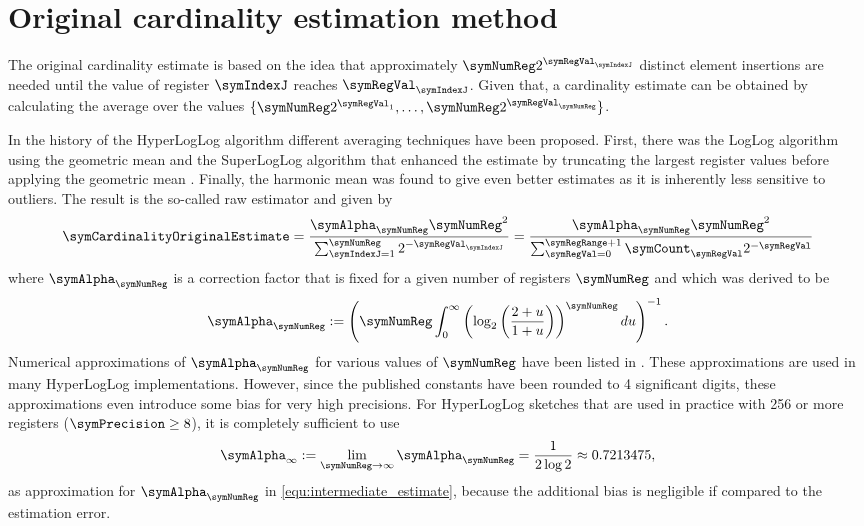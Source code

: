 \documentclass[a4paper]{scrartcl}
\begin{document}
\section{Original cardinality estimation method}
\label{sec:cardinality_estimation}
The original cardinality estimate \cite{Flajolet2007} is based on the idea that approximately $\symNumReg  2^{\symRegVal_\symIndexJ}$ distinct element insertions are needed until the value of register $\symIndexJ$ reaches $\symRegVal_\symIndexJ$. Given that, a cardinality estimate can be obtained by calculating the average over the values $\lbrace \symNumReg 2^{\symRegVal_1},\ldots,\symNumReg2^{\symRegVal_\symNumReg}\rbrace$. 

In the history of the HyperLogLog algorithm different averaging techniques have been proposed. First, there was the LogLog algorithm using the geometric mean and the SuperLogLog algorithm that enhanced the estimate by truncating the largest register values before applying the geometric mean \cite{Durand2003}. Finally, the harmonic mean was found to give even better estimates as it is inherently less sensitive to outliers. The result is the so-called raw estimator and given by
\begin{equation}
\label{equ:intermediate_estimate}
\symCardinalityOriginalEstimate
= 
\frac{\symAlpha_\symNumReg \symNumReg^2}{\sum_{\symIndexJ=1}^{\symNumReg}2^{-\symRegVal_\symIndexJ}}
= 
\frac{\symAlpha_\symNumReg \symNumReg^2}{\sum_{\symRegVal=0}^{\symRegRange+1}\symCount_\symRegVal 2^{-\symRegVal}}
\end{equation}
where $\symAlpha_\symNumReg$  is a correction factor that is fixed for a given number of registers $\symNumReg$ and which was derived to be \cite{Flajolet2007}
\begin{equation}
\symAlpha_\symNumReg := \left(
\symNumReg
\int_0^\infty
\left(
\log_2\left(
\frac{2+u}{1+u}
\right)
\right)^\symNumReg
du
\right)^{-1}.
\end{equation}
Numerical approximations of $\symAlpha_\symNumReg$ for various values of $\symNumReg$ have been listed in \cite{Flajolet2007}. These approximations are used in many HyperLogLog implementations. However, since the published constants have been rounded to 4 significant digits, these approximations even introduce some bias for very high precisions. For HyperLogLog sketches that are used in practice with 256 or more registers ($\symPrecision\geq 8$), it is completely sufficient to use 
\begin{equation}
\label{equ:alpha_inf}
\symAlpha_\infty := \lim_{\symNumReg\rightarrow\infty} \symAlpha_\symNumReg = \frac{1}{2\log 2} \approx 0.7213475,
\end{equation}
as approximation for $\symAlpha_\symNumReg$ in \eqref{equ:intermediate_estimate}, because the additional bias is negligible if compared to the estimation error.
\end{document}
